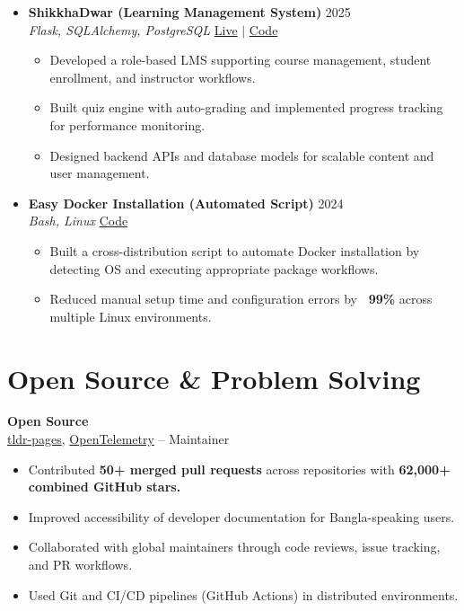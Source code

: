 \documentclass[a4paper]{article}
\newcommand{\resumeItem}[1]{
  \item\small{
    {#1 \vspace{-2pt}}
  }
}
\newcommand{\resumeItemListStart}{\begin{itemize}}
\newcommand{\resumeItemListEnd}{\end{itemize}\vspace{-5pt}}
\newcommand{\subheading}[1]{\noindent \textbf{#1} \\}
\begin{document}
\begin{itemize}[leftmargin=0.15in, label={}, itemsep=6pt]
    \item
    \textbf{ShikkhaDwar (Learning Management System)} \hfill 2025\\
    \small\textit{Flask, SQLAlchemy, PostgreSQL} \hfill
    \href{https://shikkhadwar-81r2.onrender.com/}{Live} $|$
    \href{https://github.com/nihal-kabir/ShikkhaDwar}{Code}
    \vspace{-5pt}
    \resumeItemListStart
      \resumeItem{Developed a role-based LMS supporting course management, student enrollment, and instructor workflows.}
      \resumeItem{Built quiz engine with auto-grading and implemented progress tracking for performance monitoring.}
      \resumeItem{Designed backend APIs and database models for scalable content and user management.}
    \resumeItemListEnd
    \item
    \textbf{Easy Docker Installation (Automated Script)} \hfill 2024\\
    \small\textit{Bash, Linux} \hfill
    \href{https://github.com/badhon495/Easy_Docker_Installation}{Code}
    \vspace{-5pt}
    \resumeItemListStart
      \resumeItem{Built a cross-distribution script to automate Docker installation by detecting OS and executing appropriate package workflows.}
      \resumeItem{Reduced manual setup time and configuration errors by \textbf{~99\%} across multiple Linux environments.}
    \resumeItemListEnd
    
  \end{itemize}




\section{Open Source \& Problem Solving}

\subheading{Open Source}
\href{https://github.com/tldr-pages/tldr}{tldr-pages}, \href{https://github.com/open-telemetry}{OpenTelemetry} --
Maintainer
\begin{itemize}[noitemsep, topsep=0pt]
    \item Contributed \textbf{50+ merged pull requests} across repositories with \textbf{62,000+ combined GitHub stars.}
    \item Improved accessibility of developer documentation for Bangla-speaking users.
    \item Collaborated with global maintainers through code reviews, issue tracking, and PR workflows.
    \item Used Git and CI/CD pipelines (GitHub Actions) in distributed environments.
\end{itemize}
\end{document}
